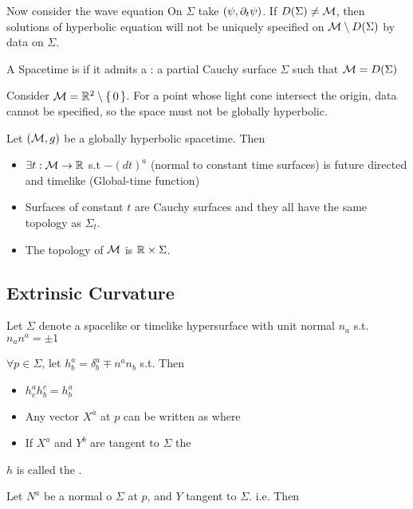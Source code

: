 \documentclass{article}
\begin{document}
Now consider the wave equation 
On $\Sigma$ take $(\psi,\partial_t\psi)$. If $D(\Sigma)\neq\mathcal{M}$, then solutions of hyperbolic equation will not be uniquely specified on $\mathcal{M}\setminus D(\Sigma)$ by data on $\Sigma$.

\begin{definition}
A Spacetime is  if it admits a  : a partial Cauchy surface $\Sigma$ such that $\mathcal{M}=D(\Sigma)$
\end{definition}

\begin{example}
Consider $\mathcal{M} = \mathbb{R}^2\setminus\set{0}$. For a point whose light cone intersect the origin, data cannot be specified, so the space must not be globally hyperbolic. 
\end{example}

\begin{theorem}[Wald]
Let $(\mathcal{M},g)$ be a globally hyperbolic spacetime. Then 
\begin{itemize}
    \item $\exists t: \mathcal{M} \to \mathbb{R}$ s.t $-(dt)^a$ (normal to constant time surfaces) is future directed and timelike (Global-time function)
    \item Surfaces of constant $t$ are Cauchy surfaces and they all have the same topology as $\Sigma_t$.
    \item The topology of $\mathcal{M}$ is $\mathbb{R}\times\Sigma$.  
\end{itemize}
\end{theorem}

\subsection{Extrinsic Curvature}
Let $\Sigma$ denote a spacelike or timelike hypersurface with unit normal $n_a$ s.t. $n_a n^a = \pm1$

\begin{lemma}
$\forall p \in \Sigma$, let $h^a_b = \delta^a_b \mp n^a n_b$ s.t. 
Then 
\begin{itemize}
    \item $h^a_c h^c_b = h^a_b$ 
    \item Any vector $X^a$ at $p$ can be written as 
    where 
    \item If $X^a$ and $Y^b$ are tangent to $\Sigma$ the 
\end{itemize}
$h$ is called the . 
\end{lemma}
Let $N^a$ be a normal o $\Sigma$ at $p$, and $Y$ tangent to $\Sigma$. i.e. 
Then 
\end{document}
